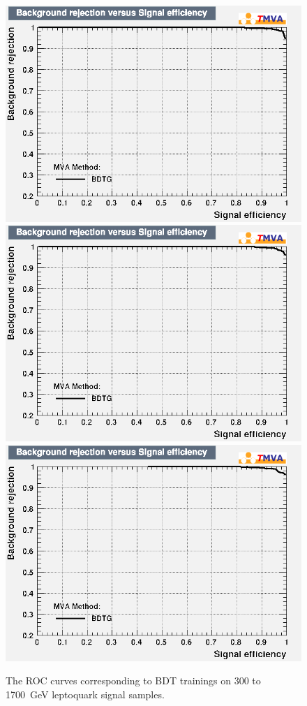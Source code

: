 \begin{figure}[H]
    {\includegraphics[width=.32\textwidth]{Images/Analysis/Results_LQToBMu_pair_uubj_BDTG_FullRun2_2023_01_25_020318/1500/rejBvsS.png}}
    {\includegraphics[width=.32\textwidth]{Images/Analysis/Results_LQToBMu_pair_uubj_BDTG_FullRun2_2023_01_25_020318/1600/rejBvsS.png}}
    {\includegraphics[width=.32\textwidth]{Images/Analysis/Results_LQToBMu_pair_uubj_BDTG_FullRun2_2023_01_25_020318/1700/rejBvsS.png}}
    \caption{The ROC curves corresponding to BDT trainings on 300 to \SI{1700}{GeV} leptoquark signal samples.}
    \label{figapp:roc1}
\end{figure}

